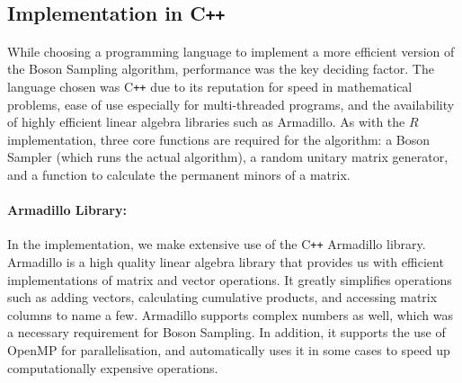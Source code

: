 \documentclass[11pt]{article}
\theoremstyle{theorem}
\theoremstyle{remark}
\theoremstyle{plain}
\theoremstyle{definition}
\begin{document}
\subsection{Implementation in C\texttt{++}}
While choosing a programming language to implement a more efficient version of the Boson Sampling algorithm, performance was the key deciding factor. The language chosen was C\texttt{++} due to its reputation for speed in mathematical problems, ease of use especially for multi-threaded programs, and the availability of highly efficient linear algebra libraries such as Armadillo. As with the $R$ implementation, three core functions are required for the algorithm: a Boson Sampler (which runs the actual algorithm), a random unitary matrix generator, and a function to calculate the permanent minors of a matrix.

\paragraph{Armadillo Library:} In the implementation, we make extensive use of the C\texttt{++} Armadillo library\cite{armadillo}. Armadillo is a high quality linear algebra library that provides us with efficient implementations of matrix and vector operations. It greatly simplifies operations such as adding vectors, calculating cumulative products, and accessing matrix columns to name a few. Armadillo supports complex numbers as well, which was a necessary requirement for Boson Sampling. In addition, it supports the use of OpenMP for parallelisation, and automatically uses it in some cases to speed up computationally expensive operations.
\end{document}
